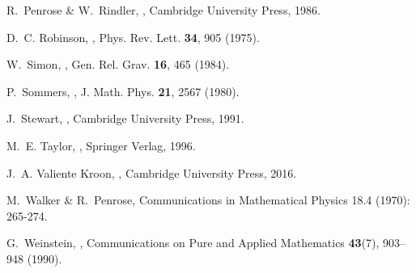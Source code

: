 \documentclass[10pt,a4paper]{article}
\theoremstyle{plain}
\begin{document}
\begin{thebibliography}{10}
R.~Penrose \& W.~Rindler,
,
\newblock Cambridge University Press, 1986.

D.~C. Robinson,
,
\newblock Phys. Rev. Lett. {\bf 34}, 905 (1975).

W.~Simon,
,
\newblock Gen. Rel. Grav. {\bf 16}, 465 (1984).

P.~Sommers,
,
\newblock J. Math. Phys. {\bf 21}, 2567 (1980).

J.~Stewart,
,
\newblock Cambridge University Press, 1991.

M.~E. Taylor,
,
\newblock Springer Verlag, 1996.

J.~A. {Valiente Kroon},
,
\newblock Cambridge University Press, 2016.

M.~Walker \& R.~Penrose,
\newblock Communications in Mathematical Physics 18.4 (1970): 265-274.

G.~Weinstein,
,
\newblock Communications on Pure and Applied Mathematics {\bf 43}(7), 903--948
  (1990).

\end{thebibliography}
\end{document}
